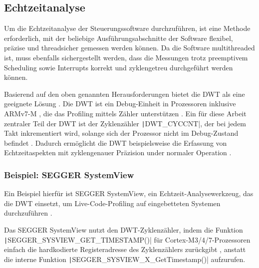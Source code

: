 \subsection{Echtzeitanalyse}

Um die Echtzeitanalyse der Steuerungssoftware durchzuführen, ist eine Methode
erforderlich, mit der beliebige Ausführungsabschnitte der Software flexibel,
präzise und threadsicher gemessen werden können. Da die Software multithreaded
ist, muss ebenfalls sichergestellt werden, dass die Messungen trotz preemptivem
Scheduling sowie Interrupts korrekt und zyklengetreu durchgeführt werden können.

Basierend auf den oben genannten Herausforderungen bietet die \ac{DWT} als eine
geeignete Lösung \cite{ARM_KA001499}. Die DWT ist ein Debug-Einheit in
Prozessoren inklusive ARMv7-M \cite{ARMv7_ref_man_dwt_about}, die das Profiling
mittels Zähler unterstützen \cite{ARMv7_ref_man_dwt_profiling}. Ein für diese
Arbeit zentraler Teil der DWT ist der Zyklenzähler \texttt|DWT_CYCCNT|,
der bei jedem Takt inkrementiert wird, solange sich der Prozessor nicht im
Debug-Zustand befindet \cite{ARMv7_ref_man_dwt_cycle}. Dadurch ermöglicht die
DWT beispielsweise die Erfassung von Echtzeitaspekten mit zyklengenauer
Präzision under normaler Operation \cite{ARMv7_ref_man_dwt}.

\subsubsection{Beispiel: SEGGER SystemView}

Ein Beispiel hierfür ist SEGGER SystemView, ein Echtzeit-Analysewerkzeug, das
die DWT einsetzt, um Live-Code-Profiling auf eingebetteten Systemen
durchzuführen \cite{SEGGER_SystemView}.

Das SEGGER SystemView nutzt den DWT-Zyklenzähler, indem die Funktion \linebreak
\texttt|SEGGER_SYSVIEW_GET_TIMESTAMP()| für Cortex-M3/4/7-Prozessoren
einfach die hardkodierte Registeradresse des Zyklenzählers zurückgibt \cite[S.
65]{Segger_SystemView_manual}\cite{Arm_DWT_Programmers_Model}, anstatt die
interne Funktion \texttt|SEGGER_SYSVIEW_X_GetTimestamp()| aufzurufen.
